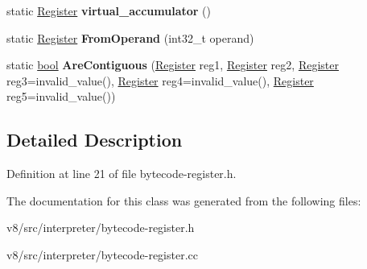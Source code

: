 \begin{DoxyCompactItemize}
static \mbox{\hyperlink{classv8_1_1internal_1_1interpreter_1_1Register}{Register}} {\bfseries virtual\+\_\+accumulator} ()
\item 
\mbox{\label{classv8_1_1internal_1_1interpreter_1_1Register_a361dbef239c6ade5668d5d29f6458617}} 
static \mbox{\hyperlink{classv8_1_1internal_1_1interpreter_1_1Register}{Register}} {\bfseries From\+Operand} (int32\+\_\+t operand)
\item 
\mbox{\label{classv8_1_1internal_1_1interpreter_1_1Register_ab866ba3f1e8ccb0d5977f1d3c386b325}} 
static \mbox{\hyperlink{classbool}{bool}} {\bfseries Are\+Contiguous} (\mbox{\hyperlink{classv8_1_1internal_1_1interpreter_1_1Register}{Register}} reg1, \mbox{\hyperlink{classv8_1_1internal_1_1interpreter_1_1Register}{Register}} reg2, \mbox{\hyperlink{classv8_1_1internal_1_1interpreter_1_1Register}{Register}} reg3=invalid\+\_\+value(), \mbox{\hyperlink{classv8_1_1internal_1_1interpreter_1_1Register}{Register}} reg4=invalid\+\_\+value(), \mbox{\hyperlink{classv8_1_1internal_1_1interpreter_1_1Register}{Register}} reg5=invalid\+\_\+value())
\end{DoxyCompactItemize}


\subsection{Detailed Description}


Definition at line 21 of file bytecode-\/register.\+h.



The documentation for this class was generated from the following files\+:\begin{DoxyCompactItemize}
\item 
v8/src/interpreter/bytecode-\/register.\+h\item 
v8/src/interpreter/bytecode-\/register.\+cc\end{DoxyCompactItemize}
